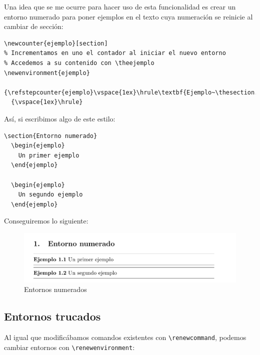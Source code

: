 Una idea que se me ocurre para hacer uso de esta funcionalidad es crear
un entorno numerado para poner ejemplos en el texto cuya numeración se
reinicie al cambiar de sección:

\begin{lstlisting}[language={[latex]tex}]
% Creamos un nuevo contador que se reinicie al cambiar de sección
\newcounter{ejemplo}[section]
% Incrementamos en uno el contador al iniciar el nuevo entorno
% Accedemos a su contenido con \theejemplo
\newenvironment{ejemplo}
  {\refstepcounter{ejemplo}\vspace{1ex}\hrule\textbf{Ejemplo~\thesection.\theejemplo}}
  {\vspace{1ex}\hrule}
\end{lstlisting}

Así, si escribimos algo de este estilo:

\begin{lstlisting}[language={[latex]tex}]
\section{Entorno numerado}
  \begin{ejemplo}
    Un primer ejemplo
  \end{ejemplo}

  \begin{ejemplo}
    Un segundo ejemplo
  \end{ejemplo}
\end{lstlisting}

Conseguiremos lo siguiente:

\begin{figure}[htbp]
\centering
\includegraphics[width=\textwidth]{docs/Figuras/entornoNum.png}
\caption{Entornos numerados}
\end{figure}

\subsection{Entornos trucados}

Al igual que modificábamos comandos existentes con
\lstinline!\renewcommand!, podemos cambiar entornos con
\lstinline!\renewenvironment!:

